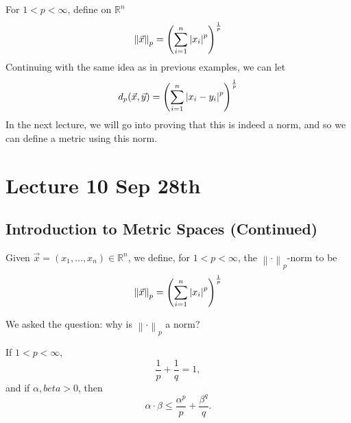 \documentclass[notoc,notitlepage]{tufte-book}
\newcommand{\norm}[1]{\left\| #1 \right\|}
\begin{document}
\begin{eg}
  For $1 < p < \infty$, define on $\mathbb{R}^n$
  \begin{equation*}
    \norm{\vec{x}}_p = \left( \sum_{i=1}^{n} \abs{x_i}^p \right)^\frac{1}{p}
  \end{equation*}
  Continuing with the same idea as in previous examples, we can let
  \begin{equation*}
    d_p(\vec{x}, \vec{y}) = \left( \sum_{i=1}^{n} \left|x_i - y_i\right|^p \right)^\frac{1}{p}
  \end{equation*}
  In the next lecture, we will go into proving that this is indeed a norm, and so we can define a metric using this norm.
\end{eg}



\chapter{Lecture 10 Sep 28th}%
\label{chp:lecture_10_sep_28th}

\section{Introduction to Metric Spaces (Continued)}%
\label{sec:introduction_to_metric_spaces_continued}

\begin{defn}[$\norm\cdot_p$-norm]\index{$\norm\cdot_p$-norm}\label{defn:p_norm}
  Given $\vec{x} = ( x_1, \ldots, x_n ) \in \mathbb{R}^n$, we define, for $1 < p < \infty$, the $\norm\cdot_p$-norm to be
  \begin{equation*}
    \norm{\vec{x}}_p = \left( \sum_{i=1}^{n} \abs{x_i}^p \right)^{\frac{1}{p}}
  \end{equation*}
\end{defn}

We asked the question: why is $\norm\cdot_p$ a norm?

\begin{lemma}\label{lemma:lemma_for_holders}
  If $1 < p < \infty$,
  \begin{equation*}
    \frac{1}{p} + \frac{1}{q} = 1,
  \end{equation*}
  and if $\alpha, beta > 0$, then
  \begin{equation*}
    \alpha \cdot \beta \leq \frac{\alpha^p}{p} + \frac{\beta^q}{q}.
  \end{equation*}
\end{lemma}
\end{document}
